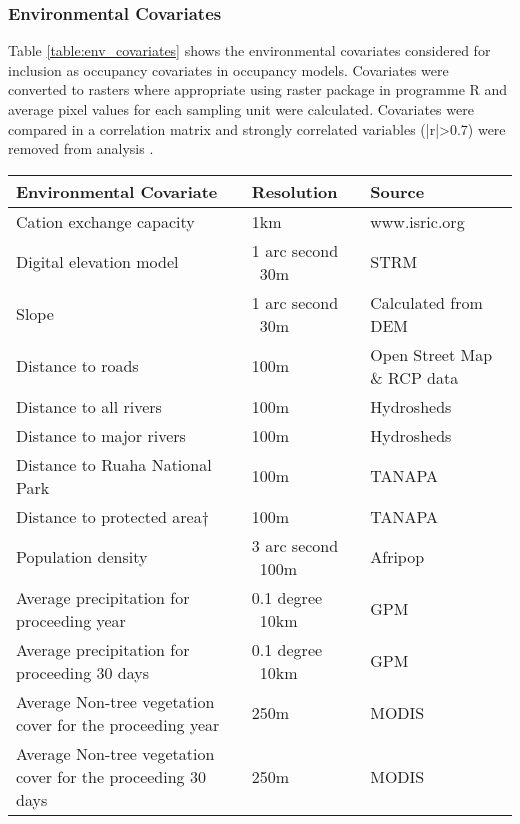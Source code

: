 \subsubsection{Environmental Covariates}
Table \ref{table:env_covariates} shows the environmental covariates considered for inclusion as occupancy covariates in occupancy models. Covariates were converted to rasters where appropriate using raster package \cite{Hijmans2014} in programme R \cite{RCoreTeam2015} and average pixel values for each sampling unit were calculated. Covariates were compared in a correlation matrix and strongly correlated variables (|r|>0.7) were removed from analysis \cite{Dormann2013}.

\begin{table}[h]
	\small
	\begin{center}
		\begin{tabular}{l p{3cm} p{7cm}}
			\hline \hline		
			Environmental Covariate	        		    & Resolution	 			& Source\\ \hline
			Cation exchange capacity	            	& 1km						& www.isric.org\\
			Digital elevation model	    		        & 1 arc second ~30m			& STRM\\
			Slope		        				    	& 1 arc second ~30m			& Calculated from DEM\\
			Distance to roads	        	    		& 100m						& Open Street Map \& RCP data\\
			Distance to all rivers		        	    & 100m						& Hydrosheds\\
			Distance to major rivers	        	    & 100m						& Hydrosheds\\
			Distance to Ruaha National Park	            & 100m						& TANAPA\\
			Distance to protected area$\dagger$	        & 100m						& TANAPA\\
			Population density				            & 3 arc second ~100m		& Afripop\\
			Average precipitation for proceeding year   & 0.1 degree ~10km  		& GPM\\
			Average precipitation for proceeding 30 days
			                                            & 0.1 degree ~10km  		& GPM\\
			Average Non-tree vegetation cover for the proceeding year
			                                            & 250m						& MODIS\\			
			Average Non-tree vegetation cover for the proceeding 30 days
			                                            & 250m						& MODIS\\			

\end{tabular}
\end{center}
\end{table}
